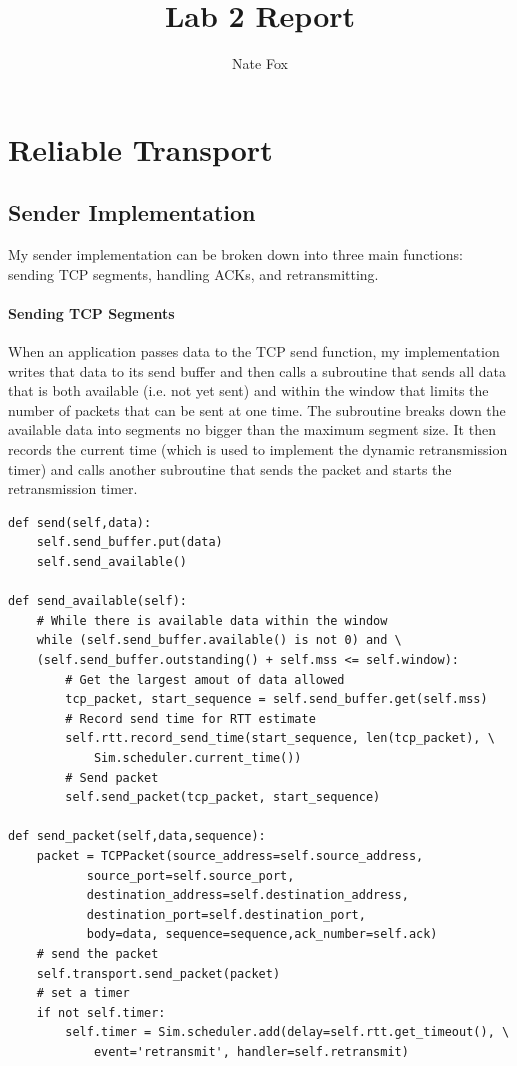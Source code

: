 \documentclass[11pt]{article}
\begin{document}
\lstset{
  language=Python,
  basicstyle=\small,          %
  keywordstyle=\bfseries,
  identifierstyle=,           %
  commentstyle=,              %
  stringstyle=\ttfamily,      %
  showstringspaces=false,     %
  numbers=left,
  numberstyle=\tiny,
  numbersep=5pt,
  frame=tb,
}

\title{Lab 2 Report}

\author{Nate Fox}

\date{}

\maketitle

\section{Reliable Transport}
\subsection{Sender Implementation}
My sender implementation can be broken down into three main functions: sending TCP segments, handling ACKs, and retransmitting.
\paragraph{Sending TCP Segments}
When an application passes data to the TCP send function, my implementation writes that data to its send buffer and then calls a subroutine that sends all data that is both available (i.e. not yet sent) and within the window that limits the number of packets that can be sent at one time. The subroutine breaks down the available data into segments no bigger than the maximum segment size. It then records the current time (which is used to implement the dynamic retransmission timer) and calls another subroutine that sends the packet and starts the retransmission timer.
\begin{lstlisting}
def send(self,data):
	self.send_buffer.put(data)
	self.send_available()

def send_available(self):
	# While there is available data within the window
	while (self.send_buffer.available() is not 0) and \
	(self.send_buffer.outstanding() + self.mss <= self.window):
		# Get the largest amout of data allowed
		tcp_packet, start_sequence = self.send_buffer.get(self.mss)
		# Record send time for RTT estimate
		self.rtt.record_send_time(start_sequence, len(tcp_packet), \
			Sim.scheduler.current_time())
		# Send packet
		self.send_packet(tcp_packet, start_sequence)

def send_packet(self,data,sequence):
	packet = TCPPacket(source_address=self.source_address,
		   source_port=self.source_port,
		   destination_address=self.destination_address,
		   destination_port=self.destination_port,
		   body=data, sequence=sequence,ack_number=self.ack)
	# send the packet
	self.transport.send_packet(packet)
	# set a timer
	if not self.timer:
		self.timer = Sim.scheduler.add(delay=self.rtt.get_timeout(), \
			event='retransmit', handler=self.retransmit)
\end{lstlisting}
\pagebreak
\end{document}
